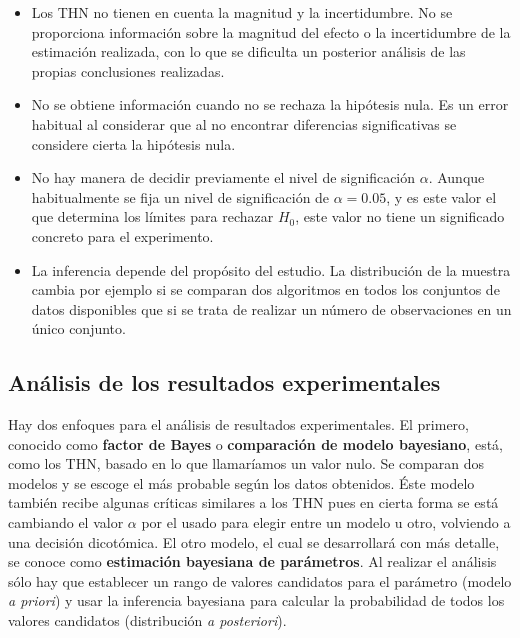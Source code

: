\begin{itemize}
\item Los THN no tienen en cuenta la magnitud y la 
	incertidumbre. No se proporciona información sobre la 
	magnitud del efecto o la incertidumbre de la estimación
	realizada, con lo que se dificulta un posterior análisis
	de las propias conclusiones realizadas.
\item No se obtiene información cuando no se rechaza la
	hipótesis nula. Es un error habitual al considerar 
	que al no encontrar diferencias significativas se
	considere cierta la hipótesis nula. 
\item No hay manera de decidir previamente el nivel 
	de significación $\alpha$. Aunque habitualmente se 
	fija un nivel de significación de $\alpha = 0.05$, y es
	este valor el que determina los límites para rechazar 
	$H_0$, este valor no tiene un significado concreto para
	el experimento. 
\item La inferencia depende del propósito del estudio. 
	La distribución de la muestra cambia por ejemplo si
	se comparan dos algoritmos en todos los conjuntos de
	datos disponibles que si se trata de realizar un 
	número de observaciones en un único conjunto.
\end{itemize}
	
\subsection{Análisis de los resultados experimentales}

	Hay dos enfoques para el análisis de resultados 
experimentales. El primero, conocido como \textbf{factor de 
Bayes} o \textbf{comparación de modelo bayesiano}, está, como 
los THN, basado en lo que llamaríamos un valor nulo. Se 
comparan dos modelos y se escoge el más probable según los 
datos obtenidos. Éste modelo también recibe algunas críticas
similares a los THN pues en cierta forma se está cambiando el
valor $\alpha$ por el usado para elegir entre un modelo u 
otro, volviendo a una decisión dicotómica. El otro modelo, el 
cual se desarrollará con más detalle, se conoce como 
\textbf{estimación bayesiana de parámetros}. Al realizar
el análisis sólo hay que establecer un rango de valores 
candidatos para el parámetro (modelo \textit{a priori}) 
y usar la inferencia bayesiana para calcular la probabilidad
de todos los valores candidatos (distribución \textit{a 
posteriori}).\\

